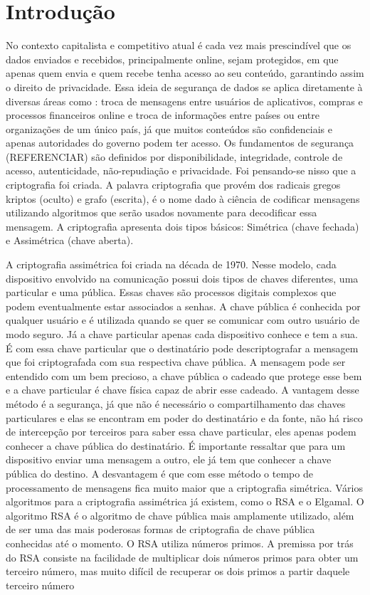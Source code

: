 \chapter{Introdução}

No contexto capitalista e competitivo atual é cada vez mais prescindível que os dados enviados e recebidos, principalmente online, sejam protegidos, em que apenas quem envia e quem recebe tenha acesso ao seu conteúdo, garantindo assim o direito de privacidade. Essa ideia de segurança de dados se aplica diretamente à diversas áreas como : troca de mensagens entre usuários de aplicativos, compras e processos financeiros online e troca de informações entre países ou entre organizações de um único país, já que muitos conteúdos são confidenciais e apenas autoridades do governo podem ter acesso.  Os fundamentos de segurança (REFERENCIAR) são definidos por disponibilidade, integridade, controle de acesso, autenticidade, não-repudiação e privacidade. Foi pensando-se nisso que a criptografia foi criada. A palavra criptografia que provém dos radicais gregos kriptos (oculto) e grafo (escrita), é o nome dado à ciência de codificar mensagens utilizando algoritmos que serão usados novamente para decodificar essa mensagem. A criptografia apresenta dois tipos básicos: Simétrica (chave fechada) e Assimétrica (chave aberta).

A criptografia assimétrica foi criada na década de 1970. Nesse modelo, cada dispositivo envolvido na comunicação possui dois tipos de chaves diferentes, uma particular e uma pública. Essas chaves são processos digitais complexos que podem eventualmente estar associados a senhas. A chave pública é conhecida por qualquer usuário e é utilizada quando se quer se comunicar com outro usuário de modo seguro. Já a chave particular apenas cada dispositivo conhece e tem a sua. É com essa chave particular que o destinatário pode descriptografar a mensagem que foi criptografada com sua respectiva chave pública. A mensagem pode ser entendido com um bem precioso, a chave pública o cadeado que protege esse bem e a chave particular é chave física capaz de abrir esse cadeado. A vantagem desse método é a segurança, já que não é necessário o compartilhamento das chaves particulares e elas se encontram em poder do destinatário e da fonte, não há risco de intercepção por terceiros para saber essa chave particular, eles apenas podem conhecer a chave pública do destinatário. É importante ressaltar que para um dispositivo enviar uma mensagem a outro, ele já tem que conhecer a chave pública do destino.  A desvantagem é que com esse método o tempo de processamento de mensagens fica muito maior que a criptografia simétrica. Vários algoritmos para a criptografia assimétrica já existem, como o RSA e o Elgamal. O algoritmo RSA é o algoritmo de chave pública mais amplamente utilizado, além de ser uma das mais poderosas formas de criptografia de chave pública conhecidas até o momento. O RSA utiliza números primos. A premissa por trás do RSA consiste na facilidade de multiplicar dois números primos para obter um terceiro número, mas muito difícil de recuperar os dois primos a partir daquele terceiro número

